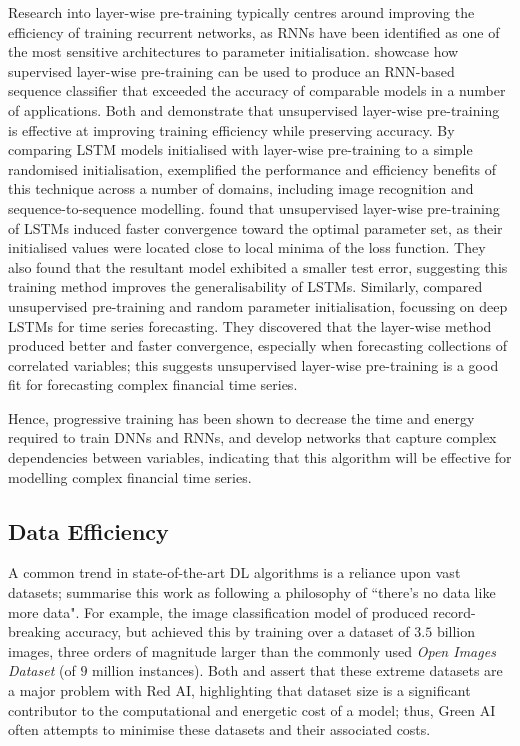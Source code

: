 \documentclass[a4paper, 11pt]{report}
\begin{document}
    Research into layer-wise pre-training typically centres around improving the efficiency of training recurrent networks, as RNNs have been identified as one of the most sensitive architectures to parameter initialisation. \citet{ienco-2019} showcase how supervised layer-wise pre-training can be used to produce an RNN-based sequence classifier that exceeded the accuracy of comparable models in a number of applications. Both \citet{xu-2018} and \citet{sagheer-2019} demonstrate that unsupervised layer-wise pre-training is effective at improving training efficiency while preserving accuracy. By comparing LSTM models initialised with layer-wise pre-training to a simple randomised initialisation, \citet{xu-2018} exemplified the performance and efficiency benefits of this technique across a number of domains, including image recognition and sequence-to-sequence modelling. \citet{xu-2018} found that unsupervised layer-wise pre-training of LSTMs induced faster convergence toward the optimal parameter set, as their initialised values were located close to local minima of the loss function. They also found that the resultant model exhibited a smaller test error, suggesting this training method improves the generalisability of LSTMs. Similarly, \citet{sagheer-2019} compared unsupervised pre-training and random parameter initialisation, focussing on deep LSTMs for time series forecasting. They discovered that the layer-wise method produced better and faster convergence, especially when forecasting collections of correlated variables; this suggests unsupervised layer-wise pre-training is a good fit for forecasting complex financial time series.

    Hence, progressive training has been shown to decrease the time and energy required to train DNNs and RNNs, and develop networks that capture complex dependencies between variables, indicating that this algorithm will be effective for modelling complex financial time series.


    \subsection{Data Efficiency}

    A common trend in state-of-the-art DL algorithms is a reliance upon vast datasets; \citet{bender-2021} summarise this work as following a philosophy of ``there's no data like more data". For example, the image classification model of \citet{mahajan-2018} produced record-breaking accuracy, but achieved this by training over a dataset of $3.5$ billion images, three orders of magnitude larger than the commonly used \emph{Open Images Dataset} (of $9$ million instances). Both \citet{schwartz-2019} and \citet{bender-2021} assert that these extreme datasets are a major problem with Red AI, highlighting that dataset size is a significant contributor to the computational and energetic cost of a model; thus, Green AI often attempts to minimise these datasets and their associated costs.
\end{document}
